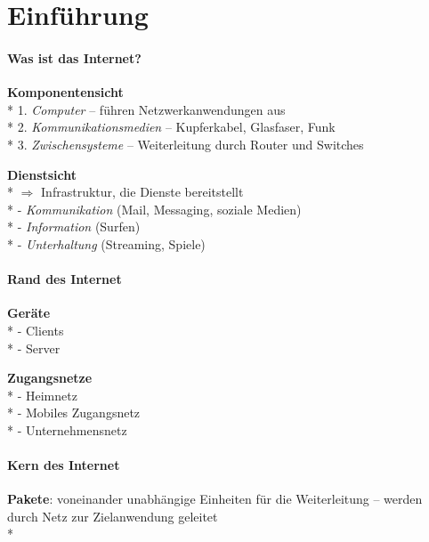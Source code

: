 \section{Einführung}

\paragraph{Was ist das Internet?}
\begin{items}
  \item \textbf{Komponentensicht} \\*
    1. \emph{Computer} -- führen Netzwerkanwendungen aus \\*
    2. \emph{Kommunikationsmedien} -- Kupferkabel, Glasfaser, Funk \\*
    3. \emph{Zwischensysteme} -- Weiterleitung durch Router und Switches
  \item \textbf{Dienstsicht} \\*
    \( \Rightarrow \) Infrastruktur, die Dienste bereitstellt \\*
    - \emph{Kommunikation} (Mail, Messaging, soziale Medien) \\*
    - \emph{Information} (Surfen) \\*
    - \emph{Unterhaltung} (Streaming, Spiele)
\end{items}

\paragraph{Rand des Internet}
\begin{items}
  \item \textbf{Geräte} \\*
    - Clients \\*
    - Server
  \item \textbf{Zugangsnetze} \\*
    - Heimnetz \\*
    - Mobiles Zugangsnetz \\*
    - Unternehmensnetz
\end{items}

\paragraph{Kern des Internet}
\begin{items}
  \item \textbf{Pakete}: voneinander unabhängige Einheiten für die Weiterleitung -- werden durch Netz zur Zielanwendung geleitet \\*
\end{items}